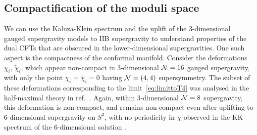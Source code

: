 \documentclass[a4paper, 11pt]{article}
\numberwithin{equation}{section}
\newcommand{\ts}[1]{\widetilde{#1}}
\newcommand{\+}{\oplus}
\renewcommand{\d}{\ensuremath{\mathrm{d}}\xspace}
\begin{document}


\subsection{Compactification of the moduli space} \label{s:Compact}

We can use the Kaluza-Klein spectrum and the uplift of the 3-dimensional gauged supergravity models to IIB supergravity to understand properties of the dual CFTs that are obscured in the lower-dimensional supergravities. One such aspect is the compactness of the conformal manifold. Consider the deformations $\chi_i$, $\ts{\chi}_i$, which appear non-compact in 3-dimensional ${\cal N}=16$ gauged supergravity, with only the point $\chi_i = \ts{\chi}_i = 0$ having ${\cal N}=(4,4)$ supersymmetry. The subset of these deformations corresponding to the limit~\eqref{eq:limittoT4} was analysed in the half-maximal theory in ref.~\cite{Eloy:2021fhc}. Again, within 3-dimensional ${\cal N}=8$ supergravity, this deformation is non-compact, and remains non-compact even after uplifting to 6-dimensional supergravity on $S^3$, with no periodicity in $\chi$ observed in the KK spectrum of the 6-dimensional solution \cite{Eloy:2021fhc}.
\end{document}
